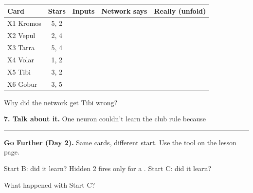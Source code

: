 \documentclass[11pt]{article}
\begin{document}
\vspace{0.3em}
\begin{tabular}{|l|c|c|c|R{1.5in}|}
\hline
\textbf{Card} & \textbf{Stars} & \textbf{Inputs} & \textbf{Network says} & \textbf{Really (unfold)} \\ \hline
X1 Kromos & 5, 2 &  &  &  \\ \hline
X2 Vepul & 2, 4 &  &  &  \\ \hline
X3 Tarra & 5, 4 &  &  &  \\ \hline
X4 Volar & 1, 2 &  &  &  \\ \hline
X5 Tibi & 3, 2 &  &  &  \\ \hline
X6 Gobur & 3, 5 &  &  &  \\ \hline
\end{tabular}

\vspace{0.5em}
Why did the network get Tibi wrong? 

\vspace{0.9em}
{\large\textbf{7. Talk about it.}} One neuron couldn't learn the club rule because 

\vspace{1.2em}
\hrule
\vspace{0.7em}
{\large\textbf{Go Further (Day 2).}} Same cards, different start. Use the tool on the lesson page.

\vspace{0.5em}
Start B: did it learn?  \quad Hidden 2 fires only for a . \quad Start C: did it learn? 

\vspace{0.6em}
What happened with Start C? 
\end{document}

